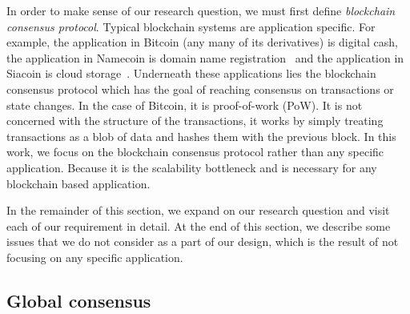 In order to make sense of our research question, we must first define \emph{blockchain consensus protocol}.
Typical blockchain systems are application specific.
For example, the application in Bitcoin (any many of its derivatives) is digital cash, the application in Namecoin is domain name registration~\cite{namecoin} and the application in Siacoin is cloud storage~\cite{siacoin}.
Underneath these applications lies the blockchain consensus protocol which has the goal of reaching consensus on transactions or state changes.
In the case of Bitcoin, it is proof-of-work (PoW).
It is not concerned with the structure of the transactions,
it works by simply treating transactions as a blob of data and hashes them with the previous block.
In this work, we focus on the blockchain consensus protocol rather than any specific application.
Because it is the scalability bottleneck and is necessary for any blockchain based application.

In the remainder of this section, we expand on our research question and visit each of our requirement in detail.
At the end of this section, we describe some issues that we do not consider as a part of our design,
which is the result of not focusing on any specific application.

\subsection{Global consensus}


